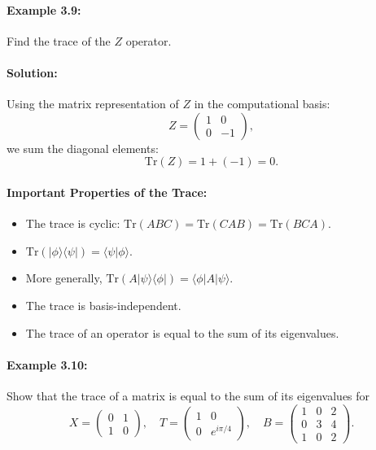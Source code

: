 \documentclass{article}
\begin{document}
\paragraph{Example 3.9:} 
Find the trace of the \(Z\) operator.

\paragraph{Solution:}
Using the matrix representation of \(Z\) in the computational basis:
\[
Z
= \begin{pmatrix} 1 & 0 \\ 0 & -1 \end{pmatrix},
\]
we sum the diagonal elements:
\[
\mathrm{Tr}(Z) = 1 + (-1) = 0.
\]

\paragraph{Important Properties of the Trace:}
\begin{itemize}
\item The trace is cyclic: \(\mathrm{Tr}(ABC) = \mathrm{Tr}(CAB) = \mathrm{Tr}(BCA)\).
\item \(\mathrm{Tr}(|\phi\rangle\langle\psi|) = \langle\psi|\phi\rangle\).
\item More generally, \(\mathrm{Tr}(A|\psi\rangle\langle\phi|) = \langle\phi|A|\psi\rangle\).
\item The trace is basis-independent.
\item The trace of an operator is equal to the sum of its eigenvalues.
\end{itemize}

\paragraph{Example 3.10:}
Show that the trace of a matrix is equal to the sum of its eigenvalues for
\[
X = \begin{pmatrix} 0 & 1\\ 1 & 0\end{pmatrix}, 
\quad
T = \begin{pmatrix} 1 & 0\\ 0 & e^{i\pi/4}\end{pmatrix},
\quad
B = \begin{pmatrix} 1 & 0 & 2\\ 0 & 3 & 4\\ 1 & 0 & 2\end{pmatrix}.
\]
\end{document}
